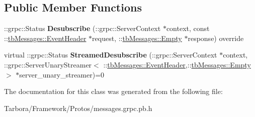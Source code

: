 \subsection*{Public Member Functions}
\begin{DoxyCompactItemize}
\item 
\mbox{\label{classtbMessages_1_1TarboraMessages_1_1WithStreamedUnaryMethod__Desubscribe_a061b9051a631294ef4d0ed91104651e9}} 
\+::grpc\+::\+Status {\bfseries Desubscribe} (\+::grpc\+::\+Server\+Context $\ast$context, const \+::\hyperlink{classtbMessages_1_1EventHeader}{tb\+Messages\+::\+Event\+Header} $\ast$request, \+::\hyperlink{classtbMessages_1_1Empty}{tb\+Messages\+::\+Empty} $\ast$response) override
\item 
\mbox{\label{classtbMessages_1_1TarboraMessages_1_1WithStreamedUnaryMethod__Desubscribe_aa55efbd76594fa04253449400699333c}} 
virtual \+::grpc\+::\+Status {\bfseries Streamed\+Desubscribe} (\+::grpc\+::\+Server\+Context $\ast$context, \+::grpc\+::\+Server\+Unary\+Streamer$<$ \+::\hyperlink{classtbMessages_1_1EventHeader}{tb\+Messages\+::\+Event\+Header},\+::\hyperlink{classtbMessages_1_1Empty}{tb\+Messages\+::\+Empty} $>$ $\ast$server\+\_\+unary\+\_\+streamer)=0
\end{DoxyCompactItemize}


The documentation for this class was generated from the following file\+:\begin{DoxyCompactItemize}
\item 
Tarbora/\+Framework/\+Protos/messages.\+grpc.\+pb.\+h\end{DoxyCompactItemize}
